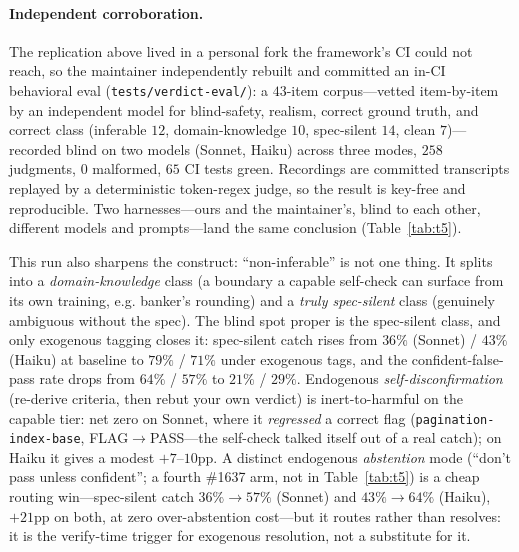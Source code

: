 \documentclass[11pt]{article}
\newcommand{\code}[1]{\texttt{#1}}
\begin{document}
\paragraph{Independent corroboration.}
The replication above lived in a personal fork the framework's CI could not reach, so the maintainer
independently rebuilt and committed an in-CI behavioral eval
(\code{tests/verdict-eval/}): a $43$-item corpus---vetted item-by-item by an independent model for
blind-safety, realism, correct ground truth, and correct class (inferable $12$, domain-knowledge $10$,
spec-silent $14$, clean $7$)---recorded blind on two models (Sonnet, Haiku) across three modes,
$258$ judgments, $0$ malformed, $65$ CI tests green. Recordings are committed transcripts replayed by
a deterministic token-regex judge, so the result is key-free and reproducible. Two harnesses---ours and
the maintainer's, blind to each other, different models and prompts---land the same conclusion
(Table~\ref{tab:t5}).

This run also sharpens the construct: ``non-inferable'' is not one thing. It splits into a
\emph{domain-knowledge} class (a boundary a capable self-check can surface from its own training, e.g.
banker's rounding) and a \emph{truly spec-silent} class (genuinely ambiguous without the spec). The
blind spot proper is the spec-silent class, and only exogenous tagging closes it: spec-silent catch
rises from $36\%$ (Sonnet) / $43\%$ (Haiku) at baseline to $79\%$ / $71\%$ under exogenous tags, and
the confident-false-pass rate drops from $64\%$ / $57\%$ to $21\%$ / $29\%$. Endogenous
\emph{self-disconfirmation} (re-derive criteria, then rebut your own verdict) is inert-to-harmful on
the capable tier: net zero on Sonnet, where it \emph{regressed} a correct flag
(\code{pagination-index-base}, FLAG$\to$PASS---the self-check talked itself out of a real catch); on
Haiku it gives a modest $+7$--$10$pp. A distinct endogenous \emph{abstention} mode (``don't pass unless
confident''; a fourth \#1637 arm, not in Table~\ref{tab:t5}) is a cheap routing win---spec-silent catch
$36\%\!\to\!57\%$ (Sonnet) and $43\%\!\to\!64\%$ (Haiku), $+21$pp on both, at zero over-abstention
cost---but it routes rather than resolves: it is the verify-time trigger for exogenous resolution, not
a substitute for it.
\end{document}
